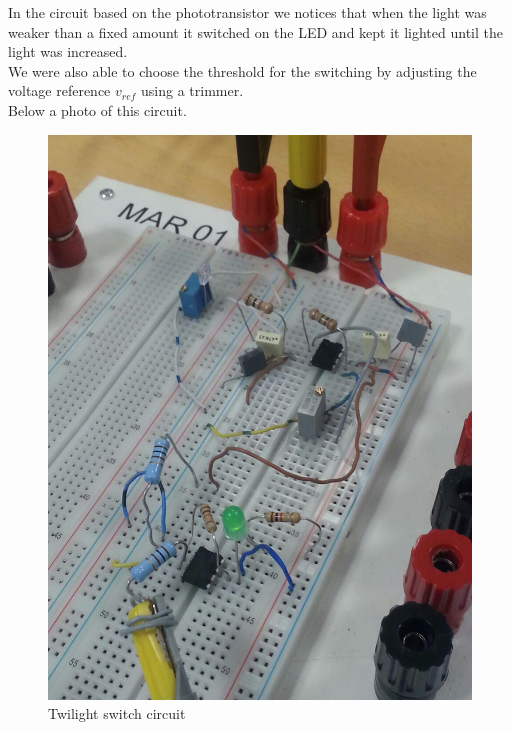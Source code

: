 In the circuit based on the phototransistor we notices that when the light was weaker than a fixed amount it switched on the LED and kept it lighted until the light was increased.\\
We were also able to choose the threshold for the switching by adjusting the voltage reference $v_{ref}$ using a trimmer.\\
Below a photo of this circuit. 
\begin{figure}[H]
\centering
\includegraphics[width=.6\textwidth]{5/sw.jpg}
\caption{Twilight switch circuit}
\end{figure}
